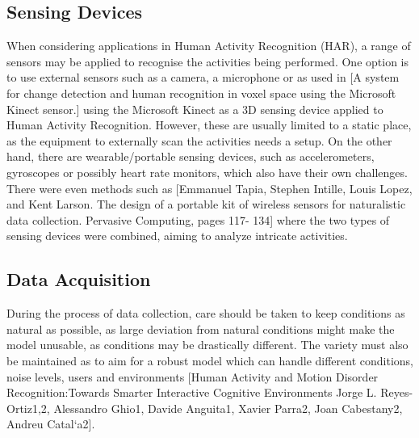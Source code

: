 
\subsection{Sensing Devices}
When considering applications in Human Activity Recognition (HAR),  a range of sensors may be applied to recognise the activities being performed.  
One option is to use external sensors such as a camera, a microphone or as used in [A system for change detection and human
recognition in voxel space using the Microsoft Kinect sensor.] using the Microsoft Kinect as a 3D sensing device applied to Human Activity Recognition. 
However, these are usually limited to a static place, as the equipment to externally scan the activities needs a setup. On the other hand, 
there are wearable/portable sensing devices, such as accelerometers, gyroscopes or possibly heart rate monitors, which also have their own challenges. There were even methods such as 
[Emmanuel Tapia, Stephen Intille, Louis Lopez, and Kent Larson. The design of a portable kit of wireless sensors for naturalistic data collection. Pervasive Computing, pages 117-
134] where the two types of sensing devices were combined, aiming to analyze intricate activities.
\subsection{Data Acquisition}

During the process of data collection, care should be taken to keep conditions as natural as possible, as large deviation from 
natural conditions might make the model unusable, as conditions may be drastically different. The variety must also be maintained as to aim for a robust model 
which can handle different conditions, noise levels, users and environments 
[Human Activity and Motion Disorder Recognition:Towards Smarter Interactive Cognitive Environments Jorge L. Reyes-Ortiz1,2, Alessandro Ghio1, Davide Anguita1, Xavier Parra2, 
Joan Cabestany2, Andreu Catal`a2]. 


